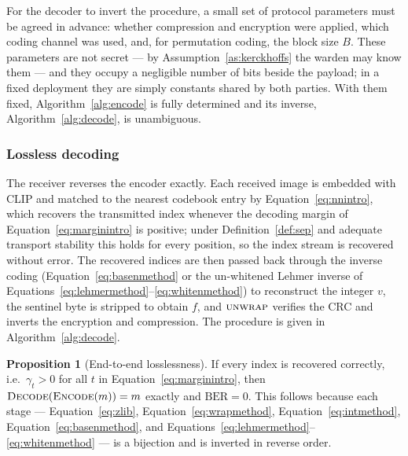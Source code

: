 \documentclass[11pt]{article}
\theoremstyle{definition}
\newtheorem{proposition}{Proposition}[section]
\newcommand{\Eqn}[1]{Equation~\eqref{#1}}
\newcommand{\Eqns}[2]{Equations~\eqref{#1}--\eqref{#2}}
\begin{document}
For the decoder to invert the procedure, a small set of protocol parameters must be
agreed in advance: whether compression and encryption were applied, which coding
channel was used, and, for permutation coding, the block size $B$. These parameters
are not secret --- by Assumption~\ref{as:kerckhoffs} the warden may know them --- and
they occupy a negligible number of bits beside the payload; in a fixed deployment
they are simply constants shared by both parties. With them fixed,
Algorithm~\ref{alg:encode} is fully determined and its inverse,
Algorithm~\ref{alg:decode}, is unambiguous.


\subsubsection{Lossless decoding}\label{sec:decode}
The receiver reverses the encoder exactly. Each received image is embedded with
CLIP and matched to the nearest codebook entry by \Eqn{eq:nnintro}, which recovers
the transmitted index whenever the decoding margin of \Eqn{eq:marginintro} is
positive; under Definition~\ref{def:sep} and adequate transport stability this
holds for every position, so the index stream is recovered without error. The
recovered indices are then passed back through the inverse coding
(\Eqn{eq:basenmethod} or the un-whitened Lehmer inverse of
\Eqns{eq:lehmermethod}{eq:whitenmethod}) to reconstruct the integer $v$, the
sentinel byte is stripped to obtain $f$, and $\textsc{unwrap}$ verifies the CRC and
inverts the encryption and compression. The procedure is given in
Algorithm~\ref{alg:decode}.

\begin{proposition}[End-to-end losslessness]\label{prop:lossless}
If every index is recovered correctly, i.e.\ $\gamma_t>0$ for all $t$ in
\Eqn{eq:marginintro}, then $\textsc{Decode}(\textsc{Encode}(m))=m$ exactly and
$\mathrm{BER}=0$. This follows because each stage
--- \Eqn{eq:zlib}, \Eqn{eq:wrapmethod}, \Eqn{eq:intmethod}, \Eqn{eq:basenmethod},
and \Eqns{eq:lehmermethod}{eq:whitenmethod} --- is a bijection and is inverted
in reverse order.
\end{proposition}
\end{document}
